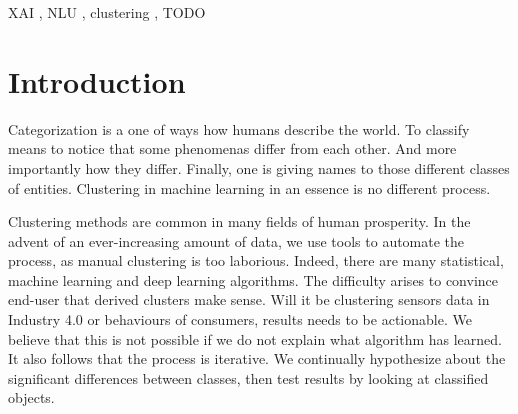 \documentclass[
]{ceurart}
\begin{document}
\begin{keywords}
  XAI \sep
  NLU \sep
  clustering \sep
  TODO
\end{keywords}

\maketitle

\section{Introduction}
Categorization is a one of ways how humans describe the world.
To classify means to notice that some phenomenas differ from each other.
And more importantly how they differ.
Finally, one is giving names to those different classes of entities.
Clustering in machine learning in an essence is no different process.

Clustering methods are common in many fields of human prosperity.
In the advent of an ever-increasing amount of data, we use tools to automate the process, as manual clustering is too laborious.
Indeed, there are many statistical, machine learning and deep learning algorithms.
The difficulty arises to convince end-user that derived clusters make sense.
Will it be clustering sensors data in Industry 4.0 or behaviours of consumers, results needs to be actionable.
We believe that this is not possible if we do not explain what algorithm has learned. %
It also follows that the process is iterative.
We continually hypothesize about the significant differences between classes, then test results by looking at classified objects.
\end{document}
